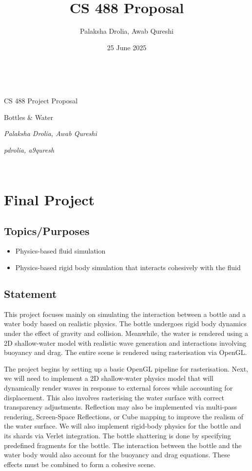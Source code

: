 

\usepackage[
    backend=biber,
    style=ieee,
]{biblatex}



\title{CS 488 Proposal}
\author{Palaksha Drolia, Awab Qureshi}
\date{25 June 2025}



~\vfill
\begin{center}
\Large

CS 488 Project Proposal

\Huge 
Bottles \& Water

\large
\textit{Palaksha Drolia, Awab Qureshi}

\textit{pdrolia, a9quresh}

\end{center}
\vfill ~\vfill~
\newpage

\section{Final Project}

\subsection{Topics/Purposes}
	\begin{itemize}
	    \item Physics-based fluid simulation
        \item Physics-based rigid body simulation that interacts cohesively with the fluid
	\end{itemize}

\subsection{Statement} This project focuses mainly on simulating the interaction between a bottle and a water body based on realistic physics. The bottle undergoes rigid body dynamics under the effect of gravity and collision. Meanwhile, the water is rendered using a 2D shallow-water model with realistic wave generation and interactions involving buoyancy and drag. The entire scene is rendered using rasterisation via OpenGL.

The project begins by setting up a basic OpenGL pipeline for rasterisation. Next, we will need to implement a 2D shallow-water physics model that will dynamically render waves in response to external forces while accounting for displacement. This also involves rasterising the water surface with correct transparency adjustments. Reflection may also be implemented via multi-pass rendering, Screen-Space Reflections, or Cube mapping to improve the realism of the water surface. We will also implement rigid-body physics for the bottle and its shards via Verlet integration. The bottle shattering is done by specifying predefined fragments for the bottle. The interaction between the bottle and the water body would also account for the buoyancy and drag equations. These effects must be combined to form a cohesive scene.

